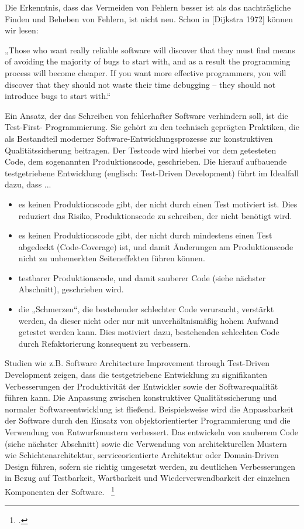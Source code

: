 Die Erkenntnis, dass das Vermeiden von Fehlern besser ist als das nachträgliche Finden
und Beheben von Fehlern, ist nicht neu. Schon in [Dijkstra 1972] können wir lesen:

„Those who want really reliable software will discover that they must find means of
avoiding the majority of bugs to start with, and as a result the programming process
will become cheaper. If you want more effective programmers, you will discover that
they should not waste their time debugging – they should not introduce bugs to start
with.“

Ein Ansatz, der das Schreiben von fehlerhafter Software verhindern soll, ist die Test-First-
Programmierung. Sie gehört zu den technisch geprägten Praktiken, die als Bestandteil moderner 
Software-Entwicklungsprozesse zur konstruktiven Qualitätssicherung beitragen.
Der Testcode wird hierbei vor dem getesteten Code, dem sogenannten Produktionscode,
geschrieben. Die hierauf aufbauende testgetriebene Entwicklung (englisch: Test-Driven
Development) führt im Idealfall dazu, dass ...
\begin{itemize}
    \item es keinen Produktionscode gibt, der nicht durch einen Test motiviert ist. Dies reduziert das Risiko, Produktionscode zu schreiben, der nicht benötigt wird.

    \item  es keinen Produktionscode gibt, der nicht durch mindestens einen Test abgedeckt (Code-Coverage) ist, und damit Änderungen am Produktionscode nicht zu unbemerkten Seiteneffekten führen können.

    \item testbarer Produktionscode, und damit sauberer Code (siehe nächster Abschnitt), geschrieben wird.

    \item die „Schmerzen“, die bestehender schlechter Code verursacht, verstärkt werden, da dieser nicht oder nur mit unverhältnismäßig hohem Aufwand getestet werden kann. Dies motiviert dazu, bestehenden schlechten Code durch Refaktorierung konsequent zu verbessern.
\end{itemize}

Studien wie z.B. \dq{}Software Architecture Improvement through Test-Driven Development\dq{} zeigen, dass die testgetriebene 
Entwicklung zu signifikanten Verbesserungen der Produktivität der Entwickler sowie der Softwarequalität führen kann. 
Die Anpassung zwischen konstruktiver Qualitätssicherung und normaler Softwareentwicklung ist fließend. Beispielsweise wird die Anpassbarkeit 
der Software durch den Einsatz von objektorientierter Programmierung und die Verwendung von 
Entwurfsmustern verbessert. Das entwickeln von sauberem Code (siehe nächster Abschnitt) sowie die Verwendung 
von architekturellen Mustern wie Schichtenarchitektur, serviceorientierte Architektur oder Domain-Driven Design 
führen, sofern sie richtig umgesetzt werden, zu deutlichen Verbesserungen in Bezug auf Testbarkeit, Wartbarkeit 
und Wiederverwendbarkeit der einzelnen Komponenten der Software. ~\footcite[Vgl.]{Janzen.2006}

